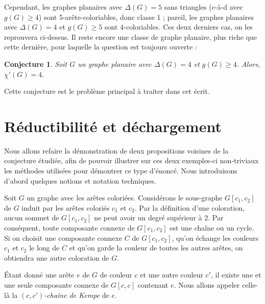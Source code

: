 \documentclass[10pt,a4paper]{article}
\newtheorem{conjecture}{Conjecture}
\begin{document}
Cependant, les graphes planaires avec $\Delta(G)=5$ sans triangles (c-à-d avec $g(G)\ge 4$) sont 5-arête-coloriables, donc classe 1 ; pareil, les graphes planaires avec $\Delta(G) = 4$ et $g(G)\ge 5$ sont $4$-coloriables. Ces deux derniers cas, on les reprouvera ci-dessus. Il reste encore une classe de graphe planaire, plus riche que cette dernière, pour laquelle la question est toujours ouverte :

\begin{conjecture}
Soit $G$ un graphe planaire avec $\Delta(G) = 4$ et $g(G) \geq 4$. Alors, $\chi'(G) = 4$. 
\end{conjecture} 

Cette conjecture est le problème principal à traiter dans cet écrit. 

\section{Réductibilité et déchargement}
\label{chap:easy}

Nous allons refaire la démonstration de deux propositions voisines de la conjecture étudiée, afin de pouvoir illustrer sur ces deux exemples-ci non-triviaux les méthodes utilisées pour démontrer ce type d'énoncé. Nous introduisons d'abord quelques notions et notation techniques.

Soit $G$ un graphe avec les arêtes coloriées. 
Considérons le sous-graphe $G[c_1,c_2]$ de $G$ induit par les arêtes coloriés $c_1$ et $c_2$. Par la définition d'une coloration, aucun sommet de $G[c_1,c_2]$ ne peut avoir un degré supérieur à 2. Par conséquent, toute composante connexe de $G[c_1,c_2]$ est une chaîne ou un cycle. Si on choisit une composante connexe $C$ de $G[c_1,c_2]$, qu'on échange les couleurs $c_1$ et $c_2$ le long de $C$ et qu'on garde la couleur de toutes les autres arêtes, on obtiendra une autre coloration de $G$.

Étant donné une arête $e$ de $G$ de couleur $c$ et une autre couleur $c'$, il existe une et une seule composante connexe de $G[c,c]$ contenant $e$.
Nous allons appeler celle-là la \emph{$(c,c')$-chaîne de Kempe} de $e$.


\end{document}

